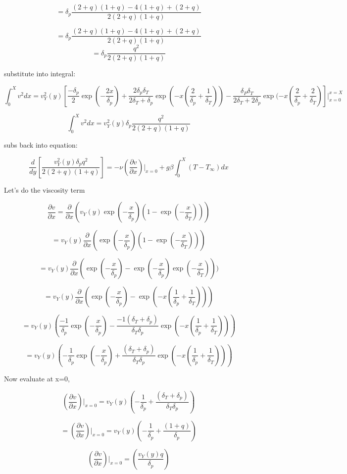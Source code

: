 \documentclass[11pt]{article}
\begin{document}
$$=\delta_p \frac{(2+ q)(1+q)-4(1+q)+(2+q)  }{2(2+q)(1+ q)}$$

$$=\delta_p \frac{(2+ q)(1+q)-4(1+q)+(2+q)  }{2(2+q)(1+ q)}$$
$$=\delta_p \frac{q^2  }{2(2+q)(1+ q)}$$

substitute into integral:

$$\int_0^X v^2 dx = v_Y^2 (y) [  \frac{-\delta_p}{2} \exp (-\frac{2x}{\delta_p}) + \frac{2\delta_p \delta_T}{2\delta_T + \delta_p} \exp (-x(\frac{2}{\delta_p} + \frac{1}{\delta_T}))  - \frac{\delta_P \delta_T}{2 \delta_T + 2\delta_p}  \exp (-x(\frac{2}{\delta_p}+\frac{2}{\delta_T}) ]|_{x=0}^{x=X} $$


$$\int_0^X v^2 dx = v_Y^2 (y) \delta_p \frac{q^2  }{2(2+q)(1+ q)} $$

subs back into equation:

$$\frac{d}{dy} \left[  \frac{v_Y^2 (y) \delta_p q^2  }{2(2+q)(1+ q)} \right] = - \nu (\frac{\partial v}{\partial x})|_{x=0} + g\beta \int_0^X (T-T_\infty) dx$$

Let's do the viscosity term 

$$\frac{\partial v}{\partial x} = \frac{\partial}{\partial x}( v_Y (y) \exp (-\frac{x}{\delta_p}) (1- \exp (-\frac{x}{\delta_T}))) $$

$$ =v_Y (y) \frac{\partial}{\partial x}(  \exp (-\frac{x}{\delta_p}) (1- \exp (-\frac{x}{\delta_T}))) $$

$$ =v_Y (y) \frac{\partial}{\partial x}(\exp (-\frac{x}{\delta_p})- \exp (-\frac{x}{\delta_p}) \exp (-\frac{x}{\delta_T}))) $$

$$ =v_Y (y) \frac{\partial}{\partial x}(\exp (-\frac{x}{\delta_p})- \exp (-x (\frac{1}{\delta_p}+\frac{1}{\delta_T})) ) $$

$$ =v_Y (y) (\frac{-1}{\delta_p} \exp (-\frac{x}{\delta_p})- \frac{-1(\delta_T+\delta_p)}{\delta_T \delta_p} \exp (-x (\frac{1}{\delta_p}+\frac{1}{\delta_T})) ) $$

$$ =v_Y (y) (-\frac{1}{\delta_p} \exp (-\frac{x}{\delta_p})+ \frac{(\delta_T+\delta_p)}{\delta_T \delta_p} \exp (-x (\frac{1}{\delta_p}+\frac{1}{\delta_T})) ) $$

Now evaluate at x=0,

$$(\frac{\partial v}{\partial x})|_{x=0} =v_Y (y) (-\frac{1}{\delta_p} + \frac{(\delta_T+\delta_p)}{\delta_T \delta_p}  ) $$

$$=(\frac{\partial v}{\partial x})|_{x=0} =v_Y (y) (-\frac{1}{\delta_p} + \frac{(1+q)}{\delta_p}  ) $$

$$(\frac{\partial v}{\partial x})|_{x=0} = ( \frac{ v_Y (y) q}{\delta_p}  ) $$
\end{document}
